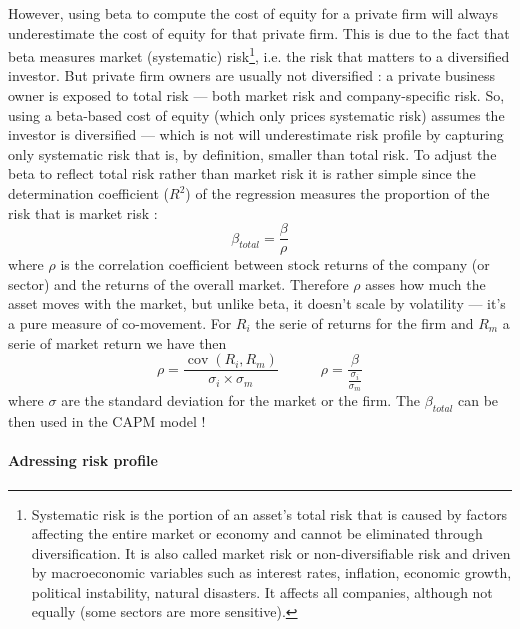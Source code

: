  However, using beta  to compute the cost of equity for a private firm will always underestimate the cost of equity for that private firm. This is due to the fact that beta measures market (systematic) risk\footnote{Systematic risk is the portion of an asset’s total risk that is caused by factors affecting the entire market or economy and cannot be eliminated through diversification. It is also called market risk or non-diversifiable risk and driven by macroeconomic variables such as interest rates, inflation, economic growth, political instability, natural disasters. It affects all companies, although not equally (some sectors are more sensitive).}, i.e. the risk that matters to a diversified investor. But private firm owners are usually not diversified : a private business owner is exposed to total risk — both market risk and company-specific risk.  So, using a beta-based cost of equity (which only prices systematic risk) assumes the investor is diversified — which is not will underestimate risk profile by capturing only systematic risk that is, by definition, smaller than total risk. To adjust the beta to reflect total risk rather than market risk it is rather simple since the determination coefficient ($R^2$) of the regression measures the proportion of the risk that is market risk :
 \begin{equation}
      \beta_{total} = \frac{\beta}{\rho}
 \end{equation}
where $\rho$ is the correlation coefficient between stock returns of the company (or sector) and the returns of the overall market. Therefore $\rho$ asses how much the asset moves with the market, but unlike beta, it doesn't scale by volatility — it’s a pure measure of co-movement. For $R_i$ the serie of returns for the firm and $R_m$ a serie of market return we have then 
\begin{equation}
    \rho = \frac{\operatorname{cov}(R_i,R_m)}{\sigma_i\times\sigma_m} \qquad \quad \rho = \frac{\beta}{\displaystyle\frac{\sigma_i}{\sigma_m}}
\end{equation}
where $\sigma$ are the standard deviation for the market or the firm. The $\beta_{total}$ can be then used in the CAPM model !

\paragraph{Adressing risk profile}

